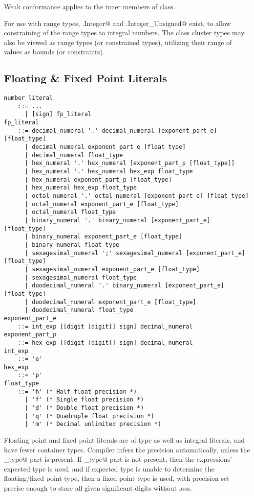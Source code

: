 Weak conformance applies to the inner members of \lstinline@Number@ class. 

For use with range types, \lstinline@Number.Integer@ and \lstinline@Number.Integer_Unsigned@ exist, to allow constraining of the range types to integral numbers. The class cluster types may also be viewed as range types (or constrained types), utilizing their range of values as bounds (or constraints). 






\subsection{Floating \& Fixed Point Literals}
\label{sec:floatliterals}
\label{sec:fixedpointliterals}

\syntax\begin{lstlisting}
number_literal
    ::= ...
      | [sign] fp_literal
fp_literal
    ::= decimal_numeral '.' decimal_numeral [exponent_part_e] [float_type]
      | decimal_numeral exponent_part_e [float_type]
      | decimal_numeral float_type
      | hex_numeral '.' hex_numeral [exponent_part_p [float_type]]
      | hex_numeral '.' hex_numeral hex_exp float_type
      | hex_numeral exponent_part_p [float_type]
      | hex_numeral hex_exp float_type
      | octal_numeral '.' octal_numeral [exponent_part_e] [float_type]
      | octal_numeral exponent_part_e [float_type]
      | octal_numeral float_type
      | binary_numeral '.' binary_numeral [exponent_part_e] [float_type]
      | binary_numeral exponent_part_e [float_type]
      | binary_numeral float_type
      | sexagesimal_numeral ';' sexagesimal_numeral [exponent_part_e] [float_type]
      | sexagesimal_numeral exponent_part_e [float_type]
      | sexagesimal_numeral float_type
      | duodecimal_numeral '.' binary_numeral [exponent_part_e] [float_type]
      | duodecimal_numeral exponent_part_e [float_type]
      | duodecimal_numeral float_type
exponent_part_e 
    ::= int_exp [[digit [digit]] sign] decimal_numeral
exponent_part_p 
    ::= hex_exp [[digit [digit]] sign] decimal_numeral
int_exp 
    ::= 'e'
hex_exp 
    ::= 'p'
float_type 
    ::= 'h' (* Half float precision *)
      | 'f' (* Single float precision *)
      | 'd' (* Double float precision *)
      | 'q' (* Quadruple float precision *)
      | 'm' (* Decimal unlimited precision *)
\end{lstlisting}

Floating point and fixed point literals are of type \lstinline@Number@ as well as integral literals, and have fewer container types. Compiler infers the precision automatically, unless the \lstinline@float_type@ part is present. If \lstinline@float_type@ part is not present, then the expressions' expected type is used, and if expected type is unable to determine the floating/fixed point type, then a fixed point type is used, with precision set precise enough to store all given significant digits without loss. 

